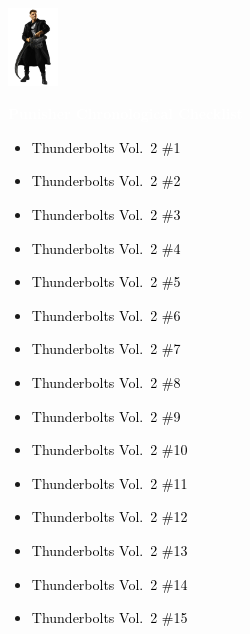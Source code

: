 \documentclass[12pt]{article}
\newcommand{\checkbox}{\raisebox{0.0ex}{\fbox{\rule{0ex}{1.5ex} \rule{1.5ex}{0ex}}}}
\begin{document}
\begin{center}
    \vspace*{2cm}
    \includegraphics[width=0.1\textwidth]{PUNISHER1.PNG}
    \vspace{0.3cm}

    {\Huge \textbf{\textcolor{white}{Punisher Chronological Checklist}}}
\end{center}

\vspace{0.3cm}
\noindent
\begin{tcolorbox}[
  colback=white!95!gray,
  colframe=black,
  width=\textwidth,
  arc=4mm,
  auto outer arc,
  boxrule=0.8pt,
  left=8pt,right=8pt,top=8pt,bottom=8pt
]
\begin{itemize}[left=0pt,label={\checkbox}]
    \item \textcolor{black}{Thunderbolts Vol.\ 2 \#1}
    \item \textcolor{black}{Thunderbolts Vol.\ 2 \#2}
    \item \textcolor{black}{Thunderbolts Vol.\ 2 \#3}
    \item \textcolor{black}{Thunderbolts Vol.\ 2 \#4}
    \item \textcolor{black}{Thunderbolts Vol.\ 2 \#5}
    \item \textcolor{black}{Thunderbolts Vol.\ 2 \#6}
    \item \textcolor{black}{Thunderbolts Vol.\ 2 \#7}
    \item \textcolor{black}{Thunderbolts Vol.\ 2 \#8}
    \item \textcolor{black}{Thunderbolts Vol.\ 2 \#9}
    \item \textcolor{black}{Thunderbolts Vol.\ 2 \#10}
    \item \textcolor{black}{Thunderbolts Vol.\ 2 \#11}
    \item \textcolor{black}{Thunderbolts Vol.\ 2 \#12}
    \item \textcolor{black}{Thunderbolts Vol.\ 2 \#13}
    \item \textcolor{black}{Thunderbolts Vol.\ 2 \#14}
    \item \textcolor{black}{Thunderbolts Vol.\ 2 \#15}
\end{itemize}
\end{tcolorbox}
\end{document}

